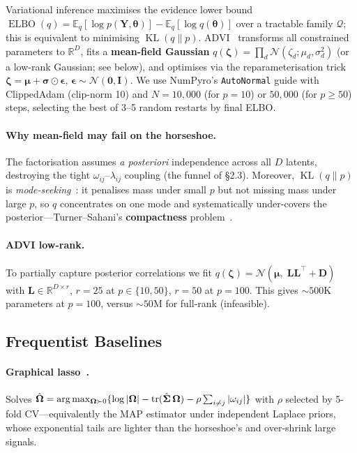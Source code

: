 \documentclass[10pt,conference,compsoc]{IEEEtran}
\newcommand{\R}{\mathbb{R}} \newcommand{\E}{\mathbb{E}} \newcommand{\Var}{\operatorname{Var}}
\newcommand{\tr}{\operatorname{tr}} \newcommand{\KL}{\operatorname{KL}} \newcommand{\ELBO}{\operatorname{ELBO}}
\newcommand{\Normal}{\mathcal{N}} \newcommand{\HalfCauchy}{\mathrm{C}^{+}} \newcommand{\InvGamma}{\mathrm{IG}}
\begin{document}
Variational inference maximises the evidence lower bound $\ELBO(q) = \E_q[\log p(\bm{Y},\bm{\theta})] - \E_q[\log q(\bm{\theta})]$ over a tractable family $\mathcal{Q}$; this is equivalent to minimising $\KL(q\|p)$. ADVI~\cite{kucukelbir2017} transforms all constrained parameters to $\R^D$, fits a \textbf{mean-field Gaussian} $q(\bm{\zeta}) = \prod_d\Normal(\zeta_d;\mu_d,\sigma_d^2)$ (or a low-rank Gaussian; see below), and optimises via the reparameterisation trick $\bm{\zeta} = \bm{\mu} + \bm{\sigma}\odot\bm{\epsilon}$, $\bm{\epsilon}\sim\Normal(\bm{0},\bm{I})$. We use NumPyro's \texttt{AutoNormal} guide with ClippedAdam (clip-norm 10) and $N=10{,}000$ (for $p{=}10$) or $50{,}000$ (for $p{\geq}50$) steps, selecting the best of 3--5 random restarts by final ELBO.

\paragraph{Why mean-field may fail on the horseshoe.} The factorisation assumes \emph{a posteriori} independence across all $D$ latents, destroying the tight $\omega_{ij}$--$\lambda_{ij}$ coupling (the funnel of §2.3). Moreover, $\KL(q\|p)$ is \emph{mode-seeking}~\cite{kucukelbir2017}: it penalises mass under small $p$ but not missing mass under large $p$, so $q$ concentrates on one mode and systematically under-covers the posterior---Turner--Sahani's \textbf{compactness} problem~\cite{turner2011}.

\paragraph{ADVI low-rank.} To partially capture posterior correlations we fit $q(\bm{\zeta}) = \Normal(\bm{\mu},\; \bm{L}\bm{L}^\top + \bm{D})$ with $\bm{L}\in\R^{D\times r}$, $r{=}25$ at $p{\in}\{10,50\}$, $r{=}50$ at $p{=}100$. This gives ${\sim}500\text{K}$ parameters at $p{=}100$, versus ${\sim}50\text{M}$ for full-rank (infeasible).

\subsection{Frequentist Baselines}

\paragraph{Graphical lasso~\cite{friedman2008}.} Solves $\hat\bOmega = \arg\max_{\bOmega \succ 0}\{\log|\bOmega| - \tr(\hat\bSigma\,\bOmega) - \rho\sum_{i\neq j}|\omega_{ij}|\}$ with $\rho$ selected by 5-fold CV---equivalently the MAP estimator under independent Laplace priors, whose exponential tails are lighter than the horseshoe's and over-shrink large signals.
\end{document}
